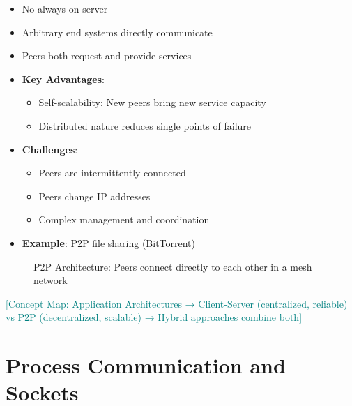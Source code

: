 \documentclass[12pt]{article}
\begin{document}
\begin{itemize}
    \item No always-on server
    \item Arbitrary end systems directly communicate
    \item Peers both request and provide services
    \item \textbf{Key Advantages}:
          \begin{itemize}
              \item Self-scalability: New peers bring new service capacity
              \item Distributed nature reduces single points of failure
          \end{itemize}
    \item \textbf{Challenges}:
          \begin{itemize}
              \item Peers are intermittently connected
              \item Peers change IP addresses
              \item Complex management and coordination
          \end{itemize}
    \item \textbf{Example}: P2P file sharing (BitTorrent)
\end{itemize}

\begin{figure}[h]
    \centering
    \caption{P2P Architecture: Peers connect directly to each other in a mesh network}
    \label{fig:p2p-arch}
\end{figure}

\textcolor{teal}{[Concept Map: Application Architectures → Client-Server (centralized, reliable) vs P2P (decentralized, scalable) → Hybrid approaches combine both]}

\section{Process Communication and Sockets}
\end{document}
